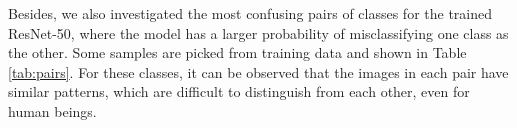 \documentclass{article}
\begin{document}
\begin{table}[h]
\caption{Top-6 F1 scores}
\label{tab:top6}
\end{table}

Besides, we also investigated the most confusing pairs of classes for the trained ResNet-50, where the model has a larger probability of misclassifying one class as the other. Some samples are picked from training data and shown in Table \ref{tab:pairs}. For these classes, it can be observed that the images in each pair have similar patterns, which are difficult to distinguish from each other, even for human beings. 
\end{document}
